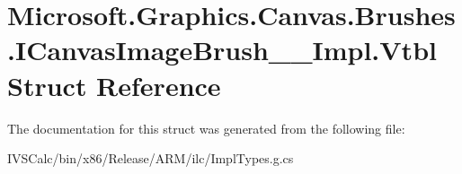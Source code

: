 \hypertarget{struct_microsoft_1_1_graphics_1_1_canvas_1_1_brushes_1_1_i_canvas_image_brush_____impl_1_1_vtbl}{}\section{Microsoft.\+Graphics.\+Canvas.\+Brushes.\+I\+Canvas\+Image\+Brush\+\_\+\+\_\+\+Impl.\+Vtbl Struct Reference}
\label{struct_microsoft_1_1_graphics_1_1_canvas_1_1_brushes_1_1_i_canvas_image_brush_____impl_1_1_vtbl}


The documentation for this struct was generated from the following file\+:\begin{DoxyCompactItemize}
\item 
I\+V\+S\+Calc/bin/x86/\+Release/\+A\+R\+M/ilc/Impl\+Types.\+g.\+cs\end{DoxyCompactItemize}
